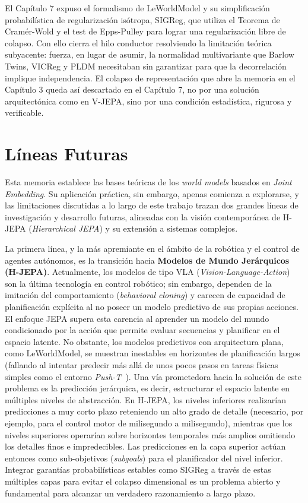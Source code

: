 El Capítulo 7 expuso el formalismo de LeWorldModel y su simplificación probabilística de regularización isótropa, SIGReg, que utiliza el Teorema de Cramér-Wold y el test de Epps-Pulley para lograr una regularización libre de colapso. Con ello cierra el hilo conductor resolviendo la limitación teórica subyacente: fuerza, en lugar de asumir, la normalidad multivariante que Barlow Twins, VICReg y PLDM necesitaban sin garantizar para que la decorrelación implique independencia. El colapso de representación que abre la memoria en el Capítulo 3 queda así descartado en el Capítulo 7, no por una solución arquitectónica como en V-JEPA, sino por una condición estadística, rigurosa y verificable.

\section{Líneas Futuras}
\label{sec:lineas_futuras}

Esta memoria establece las bases teóricas de los \emph{world models} basados en \emph{Joint Embedding}. Su aplicación práctica, sin embargo, apenas comienza a explorarse, y las limitaciones discutidas a lo largo de este trabajo trazan dos grandes líneas de investigación y desarrollo futuras, alineadas con la visión contemporánea de H-JEPA (\emph{Hierarchical JEPA}) y su extensión a sistemas complejos.

La primera línea, y la más apremiante en el ámbito de la robótica y el control de agentes autónomos, es la transición hacia \textbf{Modelos de Mundo Jerárquicos (H-JEPA)}. Actualmente, los modelos de tipo VLA (\emph{Vision-Language-Action}) son la última tecnología en control robótico; sin embargo, dependen de la imitación del comportamiento (\emph{behavioral cloning}) y carecen de capacidad de planificación explícita al no poseer un modelo predictivo de sus propias acciones. El enfoque JEPA supera esta carencia al aprender un modelo del mundo condicionado por la acción que permite evaluar secuencias y planificar en el espacio latente. No obstante, los modelos predictivos con arquitectura plana, como LeWorldModel, se muestran inestables en horizontes de planificación largos (fallando al intentar predecir más allá de unos pocos pasos en tareas físicas simples como el entorno \emph{Push-T}~\cite{klindt2026lejepa}). Una vía prometedora hacia la solución de este problema es la predicción jerárquica, es decir, estructurar el espacio latente en múltiples niveles de abstracción. En H-JEPA, los niveles inferiores realizarían predicciones a muy corto plazo reteniendo un alto grado de detalle (necesario, por ejemplo, para el control motor de milisegundo a milisegundo), mientras que los niveles superiores operarían sobre horizontes temporales más amplios omitiendo los detalles finos e impredecibles. Las predicciones en la capa superior actúan entonces como sub-objetivos (\emph{subgoals}) para el planificador del nivel inferior. Integrar garantías probabilísticas estables como SIGReg a través de estas múltiples capas para evitar el colapso dimensional es un problema abierto y fundamental para alcanzar un verdadero razonamiento a largo plazo.

